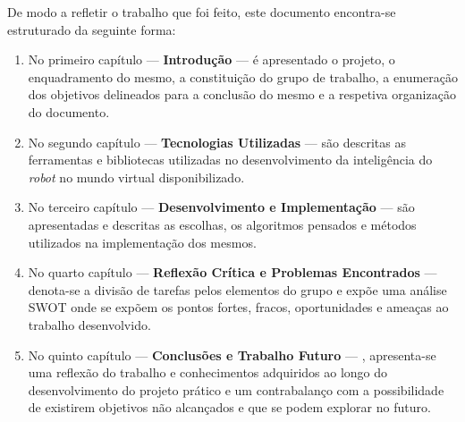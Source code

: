 De modo a refletir o trabalho que foi feito, este documento encontra-se estruturado da seguinte forma:

\begin{enumerate}
    \item No primeiro capítulo --- \textbf{Introdução} --- é apresentado o projeto, o enquadramento do mesmo, a constituição do grupo de trabalho, a enumeração dos objetivos delineados para a conclusão do mesmo e a respetiva organização do documento.
    
    \item No segundo capítulo --- \textbf{Tecnologias Utilizadas} --- são descritas as ferramentas e bibliotecas utilizadas no desenvolvimento da inteligência do \emph{robot} no mundo virtual disponibilizado.
    
    \item No terceiro capítulo --- \textbf{Desenvolvimento e Implementação} --- são apresentadas e descritas as escolhas, os algoritmos pensados e métodos utilizados na implementação dos mesmos.
    
    \item No quarto capítulo --- \textbf{Reflexão Crítica e Problemas Encontrados} --- denota-se a divisão de tarefas pelos elementos do grupo e expõe uma análise \ac{SWOT} onde se expõem os pontos fortes, fracos, oportunidades e ameaças ao trabalho desenvolvido.
    
    \item No quinto capítulo --- \textbf{Conclusões e Trabalho Futuro} --- , apresenta-se uma reflexão do trabalho e conhecimentos adquiridos ao longo do desenvolvimento do projeto prático e um contrabalanço com a possibilidade de existirem objetivos não alcançados e que se podem explorar no futuro.
\end{enumerate}